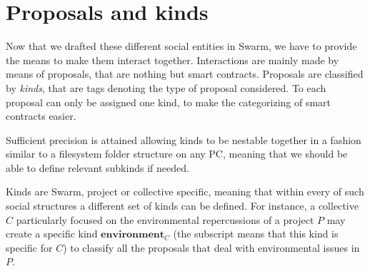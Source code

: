 \documentclass[submission, copyright,creativecommons,sharealike,noncommercial]{eptcs}
\begin{document}
\section{Proposals and kinds}
	Now that we drafted these different social entities in Swarm, we have to provide the means to make them interact together. Interactions are mainly made by means of proposals, that are nothing but smart contracts. Proposals are classified by \emph{kinds}, that are tags denoting the type of proposal considered. To each proposal can only be assigned one kind, to make the categorizing of smart contracts easier. 
	
	Sufficient precision is attained allowing kinds to be nestable together in a fashion similar to a filesystem folder structure on any PC, meaning that we should be able to define relevant subkinds if needed. 
	
	Kinds are Swarm, project or collective specific, meaning that within every of such social structures a different set of kinds can be defined. For instance, a collective $C$ particularly focused on the environmental repercussions of a project $P$ may create a specific kind $\textbf{environment}_C$ (the subscript means that this kind is specific for $C$) to classify all the proposals that deal with environmental issues in $P$. 
	
\end{document}
